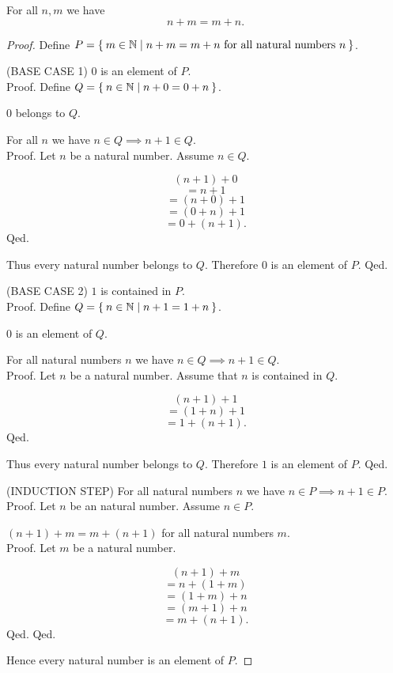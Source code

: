 \documentclass[../../arithmetic.ftl.tex]{subfiles}
\begin{document}
  \begin{forthel}
    \begin{proposition}\label{Arithmetic_01_02_273100}
      For all $n,m$ we have \[ n + m = m + n. \]
    \end{proposition}
    \begin{proof}
      Define $P = \Set{m \in \mathbb{N} | \text{$n + m = m + n$ for all natural numbers $n$}}$.

      (BASE CASE 1) $0$ is an element of $P$. \\
      Proof.
        Define $Q = \Set{n \in \mathbb{N} | n + 0 = 0 + n}$.

        $0$ belongs to $Q$.

        For all $n$ we have $n \in Q \implies n + 1 \in Q$. \\
        Proof.
          Let $n$ be a natural number.
          Assume $n \in Q$.

          \[   (n + 1) + 0 \]
          \[ = n + 1 \]        %
          \[ = (n + 0) + 1 \]  %
          \[ = (0 + n) + 1 \]  %
          \[ = 0 + (n + 1). \] %
        Qed.

        Thus every natural number belongs to $Q$.
        Therefore $0$ is an element of $P$.
      Qed.

      (BASE CASE 2) $1$ is contained in $P$. \\
      Proof.
        Define $Q = \Set{n \in \mathbb{N} | n + 1 = 1 + n}$.

        $0$ is an element of $Q$.

        For all natural numbers $n$ we have $n \in Q \implies n + 1 \in Q$. \\
        Proof.
          Let $n$ be a natural number.
          Assume that $n$ is contained in $Q$.

          \[   (n + 1) + 1 \]
          \[ = (1 + n) + 1 \]  %
          \[ = 1 + (n + 1). \] %
        Qed.

        Thus every natural number belongs to $Q$.
        Therefore $1$ is an element of $P$.
      Qed.

      (INDUCTION STEP) For all natural numbers $n$ we have $n \in P \implies n + 1 \in P$. \\
      Proof.
        Let $n$ be an natural number.
        Assume $n \in P$.

        $(n + 1) + m = m + (n + 1)$ for all natural numbers $m$. \\
        Proof.
          Let $m$ be a natural number.

          \[   (n + 1) + m \]
          \[ = n + (1 + m) \]  %
          \[ = (1 + m) + n \]  %
          \[ = (m + 1) + n \]  %
          \[ = m + (n + 1). \] %
        Qed.
      Qed.

      Hence every natural number is an element of $P$.
    \end{proof}
  \end{forthel}
\end{document}
